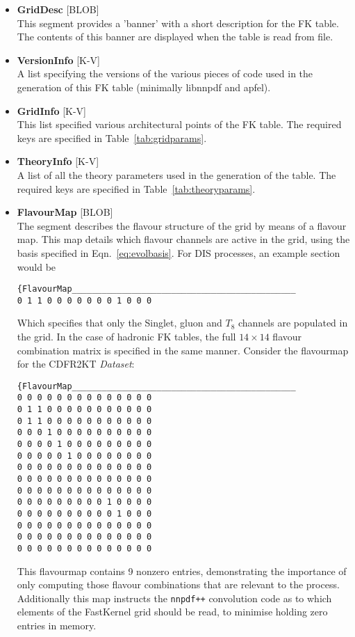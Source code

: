 \documentclass[11pt]{article}
\begin{document}
\begin{itemize}
\item \textbf{GridDesc} [BLOB] \\
	This segment provides a 'banner' with a short description for the FK table. The contents of this banner are displayed when the table is read from file.
\item \textbf{VersionInfo} [K-V]\\
	A list specifying the versions of the various pieces of code used in the generation of this FK table (minimally libnnpdf and apfel).
\item \textbf{GridInfo} [K-V]\\
	This list specified various architectural points of the FK table. The required keys are specified in Table~\ref{tab:gridparams}.
\item \textbf{TheoryInfo} [K-V]\\
	A list of all the theory parameters used in the generation of the table. The required keys are specified in Table~\ref{tab:theoryparams}.
\item \textbf{FlavourMap} [BLOB]\\
The segment describes the flavour structure
of the grid by means of a flavour map. This map details which flavour channels are active in the grid, using the basis specified in Eqn.~\ref{eq:evolbasis}. For DIS processes, an example section would be
\begin{verbatim}
{FlavourMap_____________________________________________
0 1 1 0 0 0 0 0 0 0 1 0 0 0 
\end{verbatim}
Which specifies that only the Singlet, gluon and $T_8$ channels are populated in the grid. In the case of hadronic FK tables, the full $14\times 14$ flavour combination matrix is specified in the same manner. Consider the flavourmap for the CDFR2KT \emph{Dataset}:
\begin{verbatim}
{FlavourMap_____________________________________________
0 0 0 0 0 0 0 0 0 0 0 0 0 0 
0 1 1 0 0 0 0 0 0 0 0 0 0 0 
0 1 1 0 0 0 0 0 0 0 0 0 0 0 
0 0 0 1 0 0 0 0 0 0 0 0 0 0 
0 0 0 0 1 0 0 0 0 0 0 0 0 0 
0 0 0 0 0 1 0 0 0 0 0 0 0 0 
0 0 0 0 0 0 0 0 0 0 0 0 0 0 
0 0 0 0 0 0 0 0 0 0 0 0 0 0 
0 0 0 0 0 0 0 0 0 0 0 0 0 0 
0 0 0 0 0 0 0 0 0 1 0 0 0 0 
0 0 0 0 0 0 0 0 0 0 1 0 0 0 
0 0 0 0 0 0 0 0 0 0 0 0 0 0 
0 0 0 0 0 0 0 0 0 0 0 0 0 0 
0 0 0 0 0 0 0 0 0 0 0 0 0 0
\end{verbatim}
This flavourmap contains 9 nonzero entries, demonstrating the importance of only computing those flavour combinations that are relevant to the process. Additionally this map instructs the {\tt nnpdf++} convolution code as to which elements of the FastKernel grid should be read, to minimise holding zero entries in memory.\\\\


\end{itemize}
\end{document}
